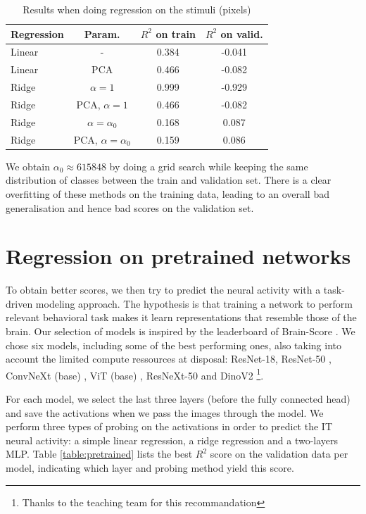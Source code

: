 \documentclass[10pt,conference,compsocconf]{IEEEtran}
\begin{document}
\begin{table}[h!]
    \centering
    \begin{tabular}{|l|c|c|c|}
        \hline
        Regression & Param. & \(R^2\) on train & \(R^2\) on valid. \\
        \hline
        Linear & - & 0.384 & -0.041 \\
        Linear & PCA & 0.466 & -0.082 \\
        Ridge & \(\alpha=1\) & 0.999 & -0.929\\
        Ridge & PCA, \(\alpha=1\) & 0.466 & -0.082 \\
        Ridge & \(\alpha=\alpha_0\) & 0.168 & 0.087 \\
        Ridge & PCA, \(\alpha=\alpha_0\) & 0.159 & 0.086 \\
        \hline
    \end{tabular}
    \caption{Results when doing regression on the stimuli (pixels)}
    \label{table:regression}
\end{table}
\vspace{-1.5em}

We obtain \(\alpha_0 \approx 615848\) by doing a grid search while keeping the same distribution of classes between the train and validation set. There is a clear overfitting of these methods on the training data, leading to an overall bad generalisation and hence bad scores on the validation set.

\section{Regression on pretrained networks}
To obtain better scores, we then try to predict the neural activity with a task-driven modeling approach. The hypothesis is that training a network to perform relevant behavioral task makes it learn representations that resemble those of the brain. Our selection of models is inspired by the leaderboard of Brain-Score \cite{SchrimpfKubilius2018BrainScore, Schrimpf2020integrative}. We chose six models, including some of the best performing ones, also taking into account the limited compute ressources at disposal: ResNet-18, ResNet-50 \cite{ResNet}, ConvNeXt (base) \cite{ConvNeXt}, ViT (base) \cite{ViT}, ResNeXt-50 \cite{ResNeXt} and DinoV2 \cite{DinoV2}\footnote{Thanks to the teaching team for this recommandation}.

For each model, we select the last three layers (before the fully connected head) and save the activations when we pass the images through the model. We perform three types of probing on the activations in order to predict the IT neural activity: a simple linear regression, a ridge regression and a two-layers MLP. Table \ref{table:pretrained} lists the best \(R^2\) score on the validation data per model, indicating which layer and probing method yield this score.
\end{document}
